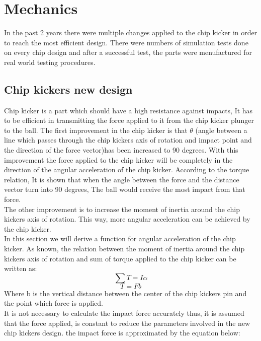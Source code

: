 \section{Mechanics}
\setlength\intextsep{0pt}
In the past 2 years there were multiple changes applied to the chip kicker in order to reach the most efficient design. There were numbers of simulation tests done on every chip design and after a successful test, the parts were menufactured for real world testing procedures.

\subsection{Chip kickers new design}
Chip kicker is a part which should have a high resistance against impacts, It has to be efficient in transmitting the force applied to it from the chip kicker plunger to the ball. The first improvement in the chip kicker is that $\theta$ (angle between a line which passes through the chip kickers axis of rotation and impact point and the direction of the force vector)has been increased to 90 degrees. With this improvement the force applied to the chip kicker will be completely in the direction of the angular acceleration of the chip kicker. According to the torque relation, It is shown that when the angle between the force and the distance vector turn into 90 degrees, The ball would receive the most impact from that force.\\
The other improvement is to increase the moment of inertia around the chip kickers axis of rotation. This way, more angular acceleration can be achieved by the chip kicker.\\
In this section we will derive a function for angular acceleration of the chip kicker. As known, the relation between the moment of inertia around the chip kickers axis of rotation and sum of torque applied to the chip kicker can be written as:
\begin{equation}
\sum T=I\alpha
\end{equation}
\begin{equation}
T=Fb
\end{equation}
Where b is the vertical distance between the center of the chip kickers pin and the point which force is applied.\\
It is not necessary to calculate the impact force accurately thus, it is assumed that the force applied, is constant to reduce the parameters involved in the new chip kickers design. the impact force is approximated by the equation below:
